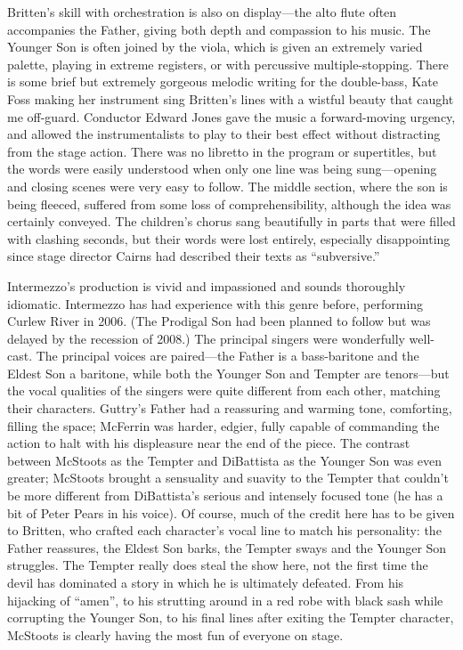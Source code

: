 Britten’s skill with orchestration is also on display—the alto flute often accompanies the Father, giving both depth and compassion to his music. The Younger Son is often joined by the viola, which is given an extremely varied palette, playing in extreme registers, or with percussive multiple-stopping. There is some brief but extremely gorgeous melodic writing for the double-bass, Kate Foss making her instrument sing Britten’s lines with a wistful beauty that caught me off-guard. Conductor Edward Jones gave the music a forward-moving urgency, and allowed the instrumentalists to play to their best effect without distracting from the stage action. There was no libretto in the program or supertitles, but the words were easily understood when only one line was being sung—opening and closing scenes were very easy to follow. The middle section, where the son is being fleeced, suffered from some loss of comprehensibility, although the idea was certainly conveyed. The children’s chorus sang beautifully in parts that were filled with clashing seconds, but their words were lost entirely, especially disappointing since stage director Cairns had described their texts as “subversive.”

Intermezzo’s production is vivid and impassioned and sounds thoroughly idiomatic. Intermezzo has had experience with this genre before, performing Curlew River in 2006. (The Prodigal Son had been planned to follow but was delayed by the recession of 2008.) The principal singers were wonderfully well-cast. The principal voices are paired—the Father is a bass-baritone and the Eldest Son a baritone, while both the Younger Son and Tempter are tenors—but the vocal qualities of the singers were quite different from each other, matching their characters. Guttry’s Father had a reassuring and warming tone, comforting, filling the space; McFerrin was harder, edgier, fully capable of commanding the action to halt with his displeasure near the end of the piece. The contrast between McStoots as the Tempter and DiBattista as the Younger Son was even greater; McStoots brought a sensuality and suavity to the Tempter that couldn’t be more different from DiBattista’s serious and intensely focused tone (he has a bit of Peter Pears in his voice). Of course, much of the credit here has to be given to Britten, who crafted each character’s vocal line to match his personality: the Father reassures, the Eldest Son barks, the Tempter sways and the Younger Son struggles. The Tempter really does steal the show here, not the first time the devil has dominated a story in which he is ultimately defeated. From his hijacking of “amen”, to his strutting around in a red robe with black sash while corrupting the Younger Son, to his final lines after exiting the Tempter character, McStoots is clearly having the most fun of everyone on stage.

